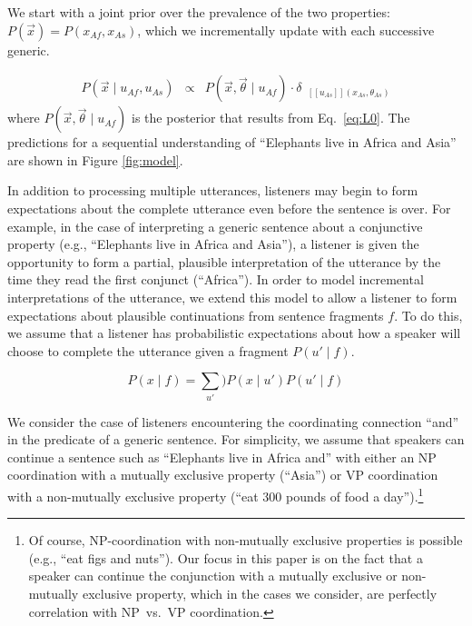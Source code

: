 \documentclass[10pt,letterpaper]{article}
\newcommand{\denote}[1]{\mbox{ $[\![ #1 ]\!]$}}
\begin{document}
We start with a joint prior over the prevalence of the two properties: $P(\vec{x}) = P(x_{Af}, x_{As})$, which we incrementally update with each successive generic. 

\begin{eqnarray}
P(\vec{x} \mid u_{Af}, u_{As})& \propto & P(\vec{x}, \vec{\theta} \mid u_{Af})  \cdot \delta_{\denote{u_{As}}(x_{As}, \theta_{As})} %
\label{eq:L0a}
\end{eqnarray}
\noindent where $P(\vec{x}, \vec{\theta} \mid u_{Af})$  is the posterior that results from Eq.~\ref{eq:L0}.
The predictions for a sequential understanding of ``Elephants live in Africa and Asia'' are shown in Figure \ref{fig:model}.

In addition to processing multiple utterances, listeners may begin to form expectations about the complete utterance even before the sentence is over. 
For example, in the case of interpreting a generic sentence about a conjunctive property (e.g., ``Elephants live in Africa and Asia''), a listener is given the opportunity to form a partial, plausible interpretation of the utterance by the time they read the first conjunct (``Africa''). 
In order to model incremental interpretations of the utterance, we extend this model to allow a listener to form expectations about plausible continuations from sentence fragments $f$.
To do this, we assume that a listener has probabilistic expectations about how a speaker will choose to complete the utterance given a fragment $P(u' \mid f)$.

\begin{equation}
P(x \mid f) = \sum_{u'}) P(x \mid u') P(u' \mid f) 
\label{eq:L0a}
\end{equation}

We consider the case of listeners encountering the coordinating connection ``and'' in the predicate of a generic sentence. 
For simplicity, we assume that speakers can continue a sentence such as ``Elephants live in Africa and'' with either an NP coordination with a mutually exclusive property (``Asia'') or VP coordination with a non-mutually exclusive property (``eat 300 pounds of food a day'').\footnote{
	Of course, NP-coordination with non-mutually exclusive properties is possible (e.g., ``eat figs and nuts''). 
	Our focus in this paper is on the fact that a speaker can continue the conjunction with a mutually exclusive or non-mutually exclusive property, which in the cases we consider, are perfectly correlation with NP~vs.~VP coordination.
}
\end{document}
